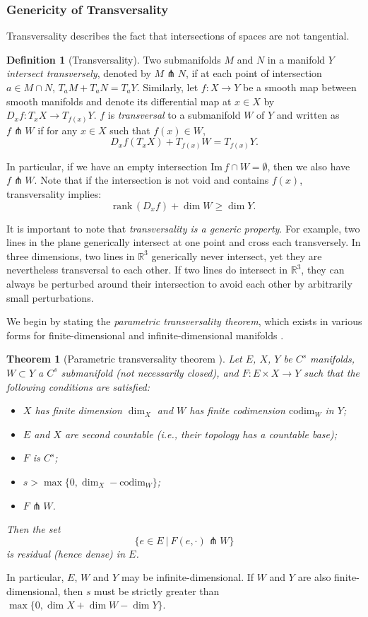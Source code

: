 \documentclass[11pt]{article}
\newcommand{\R}{\mathbb{R}}
\newcommand{\inter}{\cap}
\renewcommand{\Im}{\mathrm{Im} \,}
\newcommand{\rank}{\mathrm{rank} \,}
\theoremstyle{plain}
\newtheorem{thm}{Theorem}
\theoremstyle{definition}
\newtheorem{defi}{Definition}
\theoremstyle{remark}
\begin{document}
	
	\subsubsection{Genericity of Transversality}
	Transversality describes the fact that intersections of spaces are not tangential. 
	
	\begin{defi}[Transversality]
		Two submanifolds $M$ and $N$ in a manifold $Y$ \textit{intersect transversely}, denoted by $M \pitchfork N$, if at each point of intersection $a \in M \inter N$, $T_a M + T_a N = T_a Y$. Similarly, let $f : X \to Y$ be a smooth map between smooth manifolds and denote its differential map at $x \in X$ by $D_x f : T_x X \to T_{f(x)} Y$. $f$ is \textit{transversal} to a submanifold $W$ of $Y$ and written as $f \pitchfork W$ if for any $x \in X$ such that $f(x) \in W$, 
		\[D_x f(T_x X) + T_{f(x)} W = T_{f(x)} Y .\]
	\end{defi}
	In particular, if we have an empty intersection $\Im f \inter W = \emptyset$, then we also have $f \pitchfork W$.
	Note that if the intersection is not void and contains $f(x)$, transversality implies:
	\[\rank(D_x f) + \dim W \geq \dim Y. \]
	
	
	It is important to note that \textit{transversality is a generic property}. For example, two lines in the plane generically intersect  at one point and cross each transversely. In three dimensions, two lines in $\R^3$ generically never intersect, yet they are nevertheless transversal to each other. If two lines do intersect in $\R^3$, they can always be perturbed around their intersection to avoid each other by arbitrarily small perturbations.
	
	We begin by stating the \textit{parametric transversality theorem}, which exists in various forms for finite-dimensional \citep{hirsch_differential_1976} and infinite-dimensional manifolds \citep{abraham_transversal_1967}.
	
	\begin{thm}[Parametric transversality theorem \citep{abraham_transversal_1967}]
		\label{thm:param_trans}
		Let $E$, $X$, $Y$ be $C^s$ manifolds, $W \subset Y$ a $C^s$ submanifold (not necessarily closed), and $F : E \times X \to Y$ such that the following conditions are satisfied:
		\begin{itemize}
			\item $X$ has finite dimension $\dim_X$ and $W$ has finite codimension $\mathrm{codim}_W$ in $Y$;
			\item $E$ and $X$ are second countable (i.e., their topology has a countable base);
			\item $F$ is $C^s$;
			\item $s > \max \{ 0, \dim_X - \mathrm{codim}_W\}$;
			\item $F \pitchfork W$.
		\end{itemize}
		Then the set
		\[ \{e \in E ~|~ F(e, \cdot) \pitchfork W \} \]
		is residual (hence dense) in $E$.
	\end{thm}
	In particular, $E$, $W$ and $Y$ may be infinite-dimensional.
	If $W$ and $Y$ are also finite-dimensional, then $s$ must be strictly greater than $\max \{ 0, \dim X + \dim W - \dim Y \}$.
	
\end{document}
